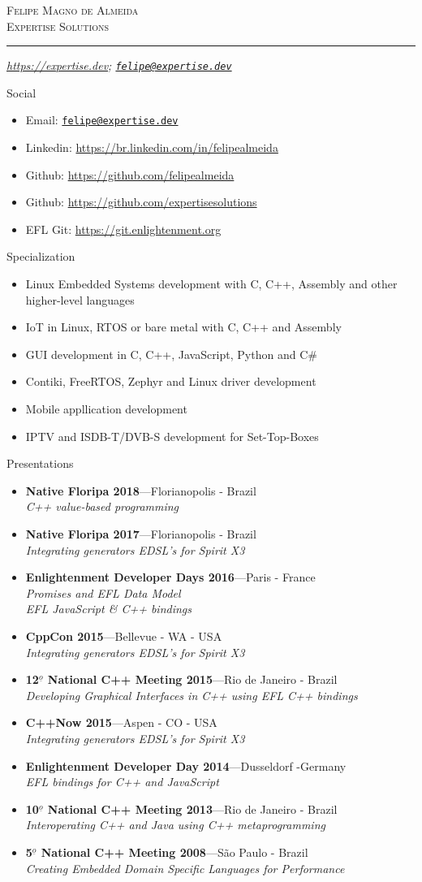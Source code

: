 \documentclass[10pt,oneside]{article}
\makeatletter
\newcommand{\name}{Felipe Magno de Almeida\\Expertise Solutions}
\newcommand{\addr}{}
\newcommand{\phone}{\url{https://expertise.dev}}
\newcommand{\email}{\href{mailto:felipe@expertise.dev}{\nolinkurl{felipe@expertise.dev}}}
\newcommand{\bigname}[1]{
	\begin{center}\fontfamily{phv}\selectfont\Huge\scshape#1\end{center}
}
\newenvironment{ressection}[1]{
	\vspace{4pt}
	{\fontfamily{phv}\selectfont\Large#1}
	\begin{itemize}
	\vspace{3pt}
}{
	\end{itemize}
}
\newcommand{\resitem}[1]{
	\vspace{-4pt}
	\item \begin{flushleft} #1 \end{flushleft}
}
\newcommand{\resbigitem}[3]{
	\vspace{-5pt}
	\item
	\textbf{#1}---#2 \\
	\textit{#3}
}
\makeatother
\begin{document}
 \selectfont

\bigname{\name}

\vspace{-8pt} \rule{\textwidth}{1pt}

\vspace{-1pt} {\small\itshape \addr \hfill \phone; \email}

\vspace{8 pt}

\begin{ressection}{Social}
  \resitem{Email: \href{mailto:felipe@expertise.dev}{\nolinkurl{felipe@expertise.dev}}}
  \resitem{Linkedin: \url{https://br.linkedin.com/in/felipealmeida}}
  \resitem{Github: \url{https://github.com/felipealmeida}}
  \resitem{Github: \url{https://github.com/expertisesolutions}}
  \resitem{EFL Git: \url{https://git.enlightenment.org}}
\end{ressection}


\begin{ressection}{Specialization}
        \resitem{Linux Embedded Systems development with C, C++,
          Assembly and other higher-level languages}
        \resitem{IoT in Linux, RTOS or bare metal with C, C++ and Assembly}
	\resitem{GUI development in C, C++, JavaScript, Python and C\#}
        \resitem{Contiki, FreeRTOS, Zephyr and Linux driver development}
        \resitem{Mobile appllication development}
        \resitem{IPTV and ISDB-T/DVB-S development for Set-Top-Boxes}
\end{ressection}


\begin{ressection}{Presentations}
  \resbigitem{Native Floripa 2018}{Florianopolis -
    Brazil}{C++ value-based programming}
  \resbigitem{Native Floripa 2017}{Florianopolis -
    Brazil}{Integrating generators EDSL's for Spirit X3}
  \resbigitem{Enlightenment Developer Days 2016}{Paris -
    France}{Promises and EFL Data Model \\ EFL JavaScript \& C++ bindings}
  \resbigitem{CppCon 2015}{Bellevue - WA -  USA}{Integrating generators EDSL's for Spirit X3}
  \resbigitem{12$^{\underline{o}}$ National C++ Meeting 2015}{Rio de Janeiro -
    Brazil}{Developing Graphical Interfaces in C++ using EFL C++ bindings}
  \resbigitem{C++Now 2015}{Aspen - CO - USA}{Integrating generators EDSL's for Spirit X3}
  \resbigitem{Enlightenment Developer Day 2014}{Dusseldorf -Germany}{EFL bindings for C++
    and JavaScript}
  \resbigitem{10$^{\underline{o}}$ National C++ Meeting 2013}{Rio de Janeiro -
    Brazil}{Interoperating C++ and Java using C++ metaprogramming}
  \resbigitem{5$^{\underline{o}}$ National C++ Meeting 2008}{São Paulo -
    Brazil}{Creating Embedded Domain Specific Languages for Performance}
\end{ressection}
\end{document}
